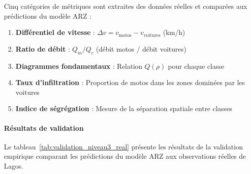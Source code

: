 Cinq catégories de métriques sont extraites des données réelles et comparées aux prédictions du modèle ARZ :

\begin{enumerate}
    \item \textbf{Différentiel de vitesse} : $\Delta v = v_{\text{motos}} - v_{\text{voitures}}$ (km/h)
    \item \textbf{Ratio de débit} : $Q_m / Q_c$ (débit motos / débit voitures)
    \item \textbf{Diagrammes fondamentaux} : Relation $Q(\rho)$ pour chaque classe
    \item \textbf{Taux d'infiltration} : Proportion de motos dans les zones dominées par les voitures
    \item \textbf{Indice de ségrégation} : Mesure de la séparation spatiale entre classes
\end{enumerate}

\paragraph{Résultats de validation}

Le tableau~\ref{tab:validation_niveau3_real} présente les résultats de la validation empirique comparant les prédictions du modèle ARZ aux observations réelles de Lagos.

